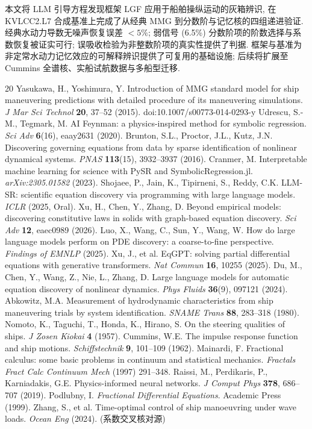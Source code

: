 \documentclass[12pt,a4paper]{ctexart}
\begin{document}
本文将 LLM 引导方程发现框架 LGF 应用于船舶操纵运动的灰箱辨识, 在 KVLCC2.L7 合成基准上完成了从经典 MMG 到分数阶与记忆核的四组递进验证. 经典水动力导数无噪声恢复误差 $<5\%$; 弱信号 (6.5\%) 分数阶项的阶数选择与系数恢复被证实可行; 误吸收检验为非整数阶项的真实性提供了判据. 框架与基准为非定常水动力记忆效应的可解释辨识提供了可复用的基础设施; 后续将扩展至 Cummins 全谱核、实船试航数据与多船型迁移.

\begin{thebibliography}{20}\small
{} Yasukawa, H., Yoshimura, Y. Introduction of MMG standard model for ship maneuvering predictions with detailed procedure of its maneuvering simulations. \textit{J Mar Sci Technol} \textbf{20}, 37--52 (2015). doi:10.1007/s00773-014-0293-y
 Udrescu, S.-M., Tegmark, M. AI Feynman: a physics-inspired method for symbolic regression. \textit{Sci Adv} \textbf{6}(16), eaay2631 (2020).
 Brunton, S.L., Proctor, J.L., Kutz, J.N. Discovering governing equations from data by sparse identification of nonlinear dynamical systems. \textit{PNAS} \textbf{113}(15), 3932--3937 (2016).
 Cranmer, M. Interpretable machine learning for science with PySR and SymbolicRegression.jl. \textit{arXiv:2305.01582} (2023).
 Shojaee, P., Jain, K., Tipirneni, S., Reddy, C.K. LLM-SR: scientific equation discovery via programming with large language models. \textit{ICLR} (2025, Oral).
 Xu, H., Chen, Y., Zhang, D. Beyond empirical models: discovering constitutive laws in solids with graph-based equation discovery. \textit{Sci Adv} \textbf{12}, eaec0989 (2026).
 Luo, X., Wang, C., Sun, Y., Wang, W. How do large language models perform on PDE discovery: a coarse-to-fine perspective. \textit{Findings of EMNLP} (2025).
 Xu, J., et al. EqGPT: solving partial differential equations with generative transformers. \textit{Nat Commun} \textbf{16}, 10255 (2025).
 Du, M., Chen, Y., Wang, Z., Nie, L., Zhang, D. Large language models for automatic equation discovery of nonlinear dynamics. \textit{Phys Fluids} \textbf{36}(9), 097121 (2024).
 Abkowitz, M.A. Measurement of hydrodynamic characteristics from ship maneuvering trials by system identification. \textit{SNAME Trans} \textbf{88}, 283--318 (1980).
 Nomoto, K., Taguchi, T., Honda, K., Hirano, S. On the steering qualities of ships. \textit{J Zosen Kiokai} \textbf{4} (1957).
 Cummins, W.E. The impulse response function and ship motions. \textit{Schiffstechnik} \textbf{9}, 101--109 (1962).
 Mainardi, F. Fractional calculus: some basic problems in continuum and statistical mechanics. \textit{Fractals Fract Calc Continuum Mech} (1997) 291--348.
 Raissi, M., Perdikaris, P., Karniadakis, G.E. Physics-informed neural networks. \textit{J Comput Phys} \textbf{378}, 686--707 (2019).
 Podlubny, I. \textit{Fractional Differential Equations}. Academic Press (1999).
 Zhang, S., et al. Time-optimal control of ship manoeuvring under wave loads. \textit{Ocean Eng} (2024). (系数交叉核对源)
\end{thebibliography}
\end{document}
